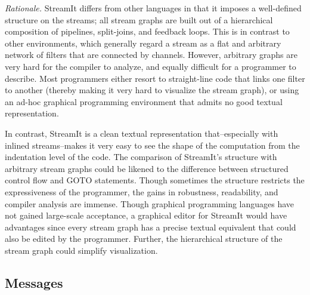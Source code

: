 \emph{Rationale.}  StreamIt differs from other languages in that it
imposes a well-defined structure on the streams; all stream graphs are
built out of a hierarchical composition of pipelines, split-joins, and
feedback loops.  This is in contrast to other environments, which
generally regard a stream as a flat and arbitrary network of filters
that are connected by channels.  However, arbitrary graphs are very
hard for the compiler to analyze, and equally difficult for a
programmer to describe.  Most programmers either resort to
straight-line code that links one filter to another (thereby making it
very hard to visualize the stream graph), or using an ad-hoc graphical
programming environment that admits no good textual representation.

In contrast, StreamIt is a clean textual representation
that--especially with inlined streams--makes it very easy to see the
shape of the computation from the indentation level of the code.  The
comparison of StreamIt's structure with arbitrary stream graphs could
be likened to the difference between structured control flow and GOTO
statements.  Though sometimes the structure restricts the
expressiveness of the programmer, the gains in robustness,
readability, and compiler analysis are immense.  Though graphical
programming languages have not gained large-scale acceptance, a
graphical editor for StreamIt would have advantages since every stream
graph has a precise textual equivalent that could also be edited by
the programmer.  Further, the hierarchical structure of the stream
graph could simplify visualization.


\subsection{Messages}

